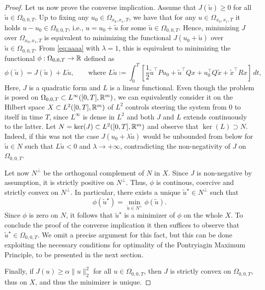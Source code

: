 \begin{proof}
    Let us now prove the converse implication.
    Assume that $J(\tilde u)\ge 0$ for all $\tilde u\in \Omega_{0,0,T}$.
    Up to fixing any $u_0\in \Omega_{x_0,x_1,T}$, we have that for any $u\in \Omega_{x_0,x_1,T}$ it holds $u - u_0 \in \Omega_{0,0,T}$, i.e., $u=u_0+\tilde u$ for some $\tilde u\in \Omega_{0,0,T}$. Hence, minimizing $J$ over $\Omega_{x_0,x_1,T}$ is equivalent to minimizing the functional $J(u_0+\tilde u)$ over $\tilde u\in \Omega_{0,0,T}$.
    From \eqref{eq:aaaa} with $\lambda=1$, this is equivalent to minimizing the functional $\phi:\Omega_{0,0,T}\to \mathbb{R}$ defined as
    \begin{equation}
        \phi(\tilde u) = J(\tilde u) + L \tilde u, 
        \qquad \text{where } 
        L \tilde u :=\int_0^T \left[\frac12\tilde u^\top P u_0 + \tilde u^\top Q x + u_0^\top Q \tilde x + \tilde x^\top Rx \right] \, dt, 
    \end{equation}
    Here, $J$ is a quadratic form and $L$ is a linear functional. 
    Even though the problem is posed on $\Omega_{0,0,T}\subset L^\infty([0,T],\mathbb{R}^m)$, we can equivalently consider it on the Hilbert space $X\subset L^2([0,T],\mathbb{R}^m)$ of $L^2$ controls steering the system from $0$ to itself in time $T$, since $L^\infty$ is dense in $L^2$ and both $J$ and $L$ extends continuously to the latter.
    Let $N = \ker(J) \subset L^2([0,T],\mathbb{R}^m)$ and observe that $\ker(L)\supset N$. Indeed, if this was not the case $J(u_0+\lambda \tilde u)$ would be unbounded from below for $\tilde u\in N$ such that $L\tilde u <0$ and $\lambda\to +\infty$, contradicting the non-negativity of $J$ on $\Omega_{0,0,T}$.

    Let now $N^\perp$ be the orthogonal complement of $N$ in $X$.
    Since $J$ is non-negative by assumption, it is strictly positive on $N^\perp$. 
    Thus, $\phi$ is continous, coercive and strictly convex on $N^\perp$. 
    In particular, there exists a unique $\tilde u^\star \in N^\perp$ such that 
    \begin{equation}
        \phi(\tilde u^\star) = \min_{\tilde u\in N^\perp} \phi(\tilde u).
    \end{equation}
    Since $\phi$ is zero on $N$, it follows that $\tilde u^\star$ is a minimizer of $\phi$ on the whole $X$.
    To conclude the proof of the converse implication it then suffices to observe that $\tilde u^\star\in \Omega_{0,0,T}$. We omit a precise argument for this fact, but this can be done exploiting the necessary conditions for optimality of the Pontryiagin Maximum Principle, to be presented in the next section.

    Finally, if $J(u)\ge \alpha\|u\|_2^2$ for all $u\in \Omega_{0,0,T}$, then $J$ is strictly convex on $\Omega_{0,0,T}$, thus on $X$, and thus the minimizer is unique.
\end{proof}


